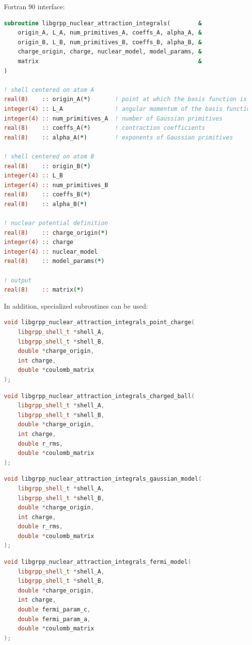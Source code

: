 \documentclass[12pt]{article}
\begin{document}
Fortran 90 interface:
\begin{lstlisting}[language=Fortran]
subroutine libgrpp_nuclear_attraction_integrals(        &
    origin_A, L_A, num_primitives_A, coeffs_A, alpha_A, &
    origin_B, L_B, num_primitives_B, coeffs_B, alpha_B, &
    charge_origin, charge, nuclear_model, model_params, &
    matrix                                              &
)

! shell centered on atom A
real(8)    :: origin_A(*)       ! point at which the basis function is centered
integer(4) :: L_A               ! angular momentum of the basis function
integer(4) :: num_primitives_A  ! number of Gaussian primitives
real(8)    :: coeffs_A(*)       ! contraction coefficients
real(8)    :: alpha_A(*)        ! exponents of Gaussian primitives

! shell centered on atom B
real(8)    :: origin_B(*)
integer(4) :: L_B
integer(4) :: num_primitives_B
real(8)    :: coeffs_B(*)
real(8)    :: alpha_B(*)

! nuclear potential definition
real(8)    :: charge_origin(*)
integer(4) :: charge
integer(4) :: nuclear_model
real(8)    :: model_params(*)

! output
real(8)    :: matrix(*)
\end{lstlisting}

In addition, specialized subroutines can be used:
\begin{lstlisting}[language=C++]
void libgrpp_nuclear_attraction_integrals_point_charge(
    libgrpp_shell_t *shell_A,
    libgrpp_shell_t *shell_B,
    double *charge_origin,
    int charge,
    double *coulomb_matrix
);
\end{lstlisting}

\begin{lstlisting}[language=C++]
void libgrpp_nuclear_attraction_integrals_charged_ball(
    libgrpp_shell_t *shell_A,
    libgrpp_shell_t *shell_B,
    double *charge_origin,
    int charge,
    double r_rms,
    double *coulomb_matrix
);
\end{lstlisting}

\begin{lstlisting}[language=C++]
void libgrpp_nuclear_attraction_integrals_gaussian_model(
    libgrpp_shell_t *shell_A,
    libgrpp_shell_t *shell_B,
    double *charge_origin,
    int charge,
    double r_rms,
    double *coulomb_matrix
);
\end{lstlisting}

\begin{lstlisting}[language=C++]
void libgrpp_nuclear_attraction_integrals_fermi_model(
    libgrpp_shell_t *shell_A,
    libgrpp_shell_t *shell_B,
    double *charge_origin,
    int charge,
    double fermi_param_c,
    double fermi_param_a,
    double *coulomb_matrix
);
\end{lstlisting}
\end{document}
